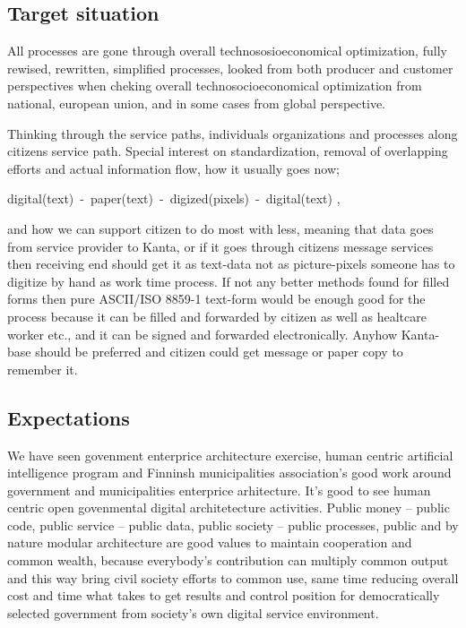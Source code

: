 \subsection{Target situation}
\label{target_situation}

All processes are gone through overall technososioeconomical optimization,
fully rewised, rewritten, simplified processes, look\-ed from both producer
and customer perspectives when cheking overall technosocioeconomical
optimization from national, european union, and in some cases from global
perspective.

Thinking through the service paths, individuals organizations and processes
along citizens service path. Special interest on standardization, removal
of overlapping efforts and actual information flow, how it usually goes now;
\hfill\break\begin{center}
digital(text)~-~paper(text)~-~digized(pixels)~-~digital(text)
\cite{VM006_00_2024},\end{center}
and how we can support citizen to do most with less, meaning that data goes
from service provider to Kanta, or if it goes through citizens message
services then receiving end should get it as text-data not as picture-pixels
someone has to digitize by hand as work time process. If not any better
methods found for filled forms then pure ASCII/ISO 8859-1 text-form would be
enough good for the process because it can be filled and forwarded by citizen
as well as healtcare worker etc., and it can be signed and forwarded
electronically. Anyhow Kanta-base should be preferred and citizen could get
message or paper copy to remember it.

\subsection{Expectations}
\label{expectations}

We have seen govenment enterprice architecture exercise, human centric
artificial intelligence program and Finninsh municipalities association's good
work around government and municipalities enterprice arhitecture. It's good
to see human centric open govenmental digital architetecture activities.
Public money -- public code\allowbreak\cite{FSFE_PublicCode}, public service
-- public data\allowbreak\cite{OpenPublicData}, public society -- public
processes\allowbreak\cite{VM_GBEA}\allowbreak\cite{Kukkonen2025}, public and
by nature modular architecture are good values to maintain cooperation and
common wealth, because everybody's contribution can multiply common output and
this way bring civil society efforts to common use, same time reducing overall
cost and time what takes to get results and control position for
democratically selected government from society's own digital service
environment.

